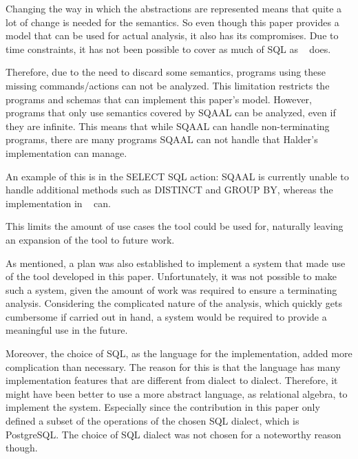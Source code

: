 Changing the way in which the abstractions are represented means that quite a lot of change is needed for the semantics.
So even though this paper provides a model that can be used for actual analysis, it also has its compromises.
Due to time constraints, it has not been possible to cover as much of SQL as ~\cite{halder_abstract_2012} does.

Therefore, due to the need to discard some semantics, programs using these missing commands/actions can not be analyzed.
This limitation restricts the programs and schemas that can implement this paper's model.
However, programs that only use semantics covered by SQAAL can be analyzed, even if they are infinite.
This means that while SQAAL can handle non-terminating programs, there are many programs SQAAL can not handle that Halder's implementation can manage.

An example of this is in the SELECT SQL action: SQAAL is currently unable to handle additional methods such as DISTINCT and GROUP BY, whereas the implementation in ~\cite{halder_abstract_2012} can.

This limits the amount of use cases the tool could be used for, naturally leaving an expansion of the tool to future work.

As mentioned, a plan was also established to implement a system that made use of the tool developed in this paper.
Unfortunately, it was not possible to make such a system, given the amount of work was required to ensure a terminating analysis.
Considering the complicated nature of the analysis, which quickly gets cumbersome if carried out in hand, a system would be required to provide a meaningful use in the future.


Moreover, the choice of SQL, as the language for the implementation, added more complication than necessary.
The reason for this is that the language has many implementation features that are different from dialect to dialect.
Therefore, it might have been better to use a more abstract language, as relational algebra, to implement the system.
Especially since the contribution in this paper only defined a subset of the operations of the chosen SQL dialect, which is PostgreSQL.
The choice of SQL dialect was not chosen for a noteworthy reason though.
